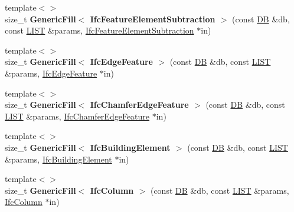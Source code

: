\begin{DoxyCompactItemize}
\item 
\hypertarget{namespace_assimp_1_1_s_t_e_p_a4b602736c7648afa1aac10794eba957a}{{\footnotesize template$<$$>$ }\\size\+\_\+t {\bfseries Generic\+Fill$<$ Ifc\+Feature\+Element\+Subtraction $>$} (const \hyperlink{class_assimp_1_1_s_t_e_p_1_1_d_b}{D\+B} \&db, const \hyperlink{class_assimp_1_1_s_t_e_p_1_1_e_x_p_r_e_s_s_1_1_l_i_s_t}{L\+I\+S\+T} \&params, \hyperlink{struct_assimp_1_1_i_f_c_1_1_ifc_feature_element_subtraction}{Ifc\+Feature\+Element\+Subtraction} $\ast$in)}\label{namespace_assimp_1_1_s_t_e_p_a4b602736c7648afa1aac10794eba957a}

\item 
\hypertarget{namespace_assimp_1_1_s_t_e_p_a817b8405c8397ea609c64a9929d9cca5}{{\footnotesize template$<$$>$ }\\size\+\_\+t {\bfseries Generic\+Fill$<$ Ifc\+Edge\+Feature $>$} (const \hyperlink{class_assimp_1_1_s_t_e_p_1_1_d_b}{D\+B} \&db, const \hyperlink{class_assimp_1_1_s_t_e_p_1_1_e_x_p_r_e_s_s_1_1_l_i_s_t}{L\+I\+S\+T} \&params, \hyperlink{struct_assimp_1_1_i_f_c_1_1_ifc_edge_feature}{Ifc\+Edge\+Feature} $\ast$in)}\label{namespace_assimp_1_1_s_t_e_p_a817b8405c8397ea609c64a9929d9cca5}

\item 
\hypertarget{namespace_assimp_1_1_s_t_e_p_ae12981680d3d255688d1162f48e99b59}{{\footnotesize template$<$$>$ }\\size\+\_\+t {\bfseries Generic\+Fill$<$ Ifc\+Chamfer\+Edge\+Feature $>$} (const \hyperlink{class_assimp_1_1_s_t_e_p_1_1_d_b}{D\+B} \&db, const \hyperlink{class_assimp_1_1_s_t_e_p_1_1_e_x_p_r_e_s_s_1_1_l_i_s_t}{L\+I\+S\+T} \&params, \hyperlink{struct_assimp_1_1_i_f_c_1_1_ifc_chamfer_edge_feature}{Ifc\+Chamfer\+Edge\+Feature} $\ast$in)}\label{namespace_assimp_1_1_s_t_e_p_ae12981680d3d255688d1162f48e99b59}

\item 
\hypertarget{namespace_assimp_1_1_s_t_e_p_af84cfdd97ace2a6765f8d865a201fa36}{{\footnotesize template$<$$>$ }\\size\+\_\+t {\bfseries Generic\+Fill$<$ Ifc\+Building\+Element $>$} (const \hyperlink{class_assimp_1_1_s_t_e_p_1_1_d_b}{D\+B} \&db, const \hyperlink{class_assimp_1_1_s_t_e_p_1_1_e_x_p_r_e_s_s_1_1_l_i_s_t}{L\+I\+S\+T} \&params, \hyperlink{struct_assimp_1_1_i_f_c_1_1_ifc_building_element}{Ifc\+Building\+Element} $\ast$in)}\label{namespace_assimp_1_1_s_t_e_p_af84cfdd97ace2a6765f8d865a201fa36}

\item 
\hypertarget{namespace_assimp_1_1_s_t_e_p_a9c8dc8eb76cd0b75b3bb5fe281b28871}{{\footnotesize template$<$$>$ }\\size\+\_\+t {\bfseries Generic\+Fill$<$ Ifc\+Column $>$} (const \hyperlink{class_assimp_1_1_s_t_e_p_1_1_d_b}{D\+B} \&db, const \hyperlink{class_assimp_1_1_s_t_e_p_1_1_e_x_p_r_e_s_s_1_1_l_i_s_t}{L\+I\+S\+T} \&params, \hyperlink{struct_assimp_1_1_i_f_c_1_1_ifc_column}{Ifc\+Column} $\ast$in)}\label{namespace_assimp_1_1_s_t_e_p_a9c8dc8eb76cd0b75b3bb5fe281b28871}


\end{DoxyCompactItemize}
